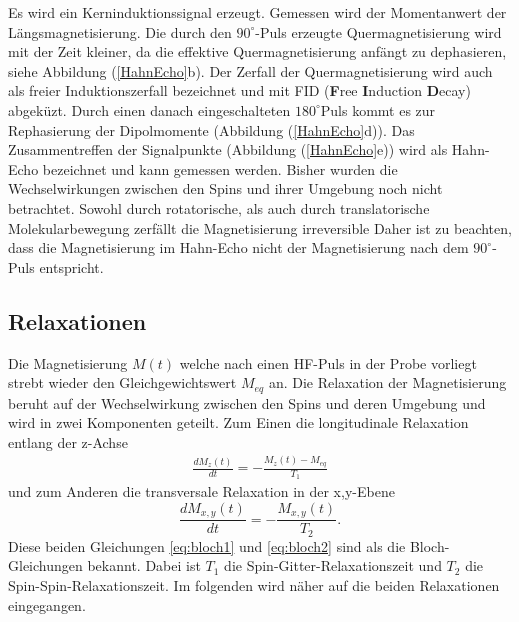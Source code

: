 Es wird ein Kerninduktionssignal erzeugt.
Gemessen wird der Momentanwert der L\"{a}ngsmagnetisierung.
Die durch den $90^{\circ}$-Puls erzeugte Quermagnetisierung wird mit der Zeit kleiner, da die effektive Quermagnetisierung anf\"{a}ngt zu dephasieren, siehe Abbildung (\ref{HahnEcho}b).
Der Zerfall der Quermagnetisierung wird auch als freier Induktionszerfall bezeichnet und mit FID (\textbf{F}ree \textbf{I}nduction \textbf{D}ecay) abgek\"{u}zt.
Durch einen danach eingeschalteten $180^{\circ}${\-}Puls kommt es zur Rephasierung der Dipol{\-}mo{\-}men{\-}te (Abbildung (\ref{HahnEcho}d)).
Das Zusam{\-}men{\-}tref{\-}fen der Signalpunkte (Abbildung (\ref{HahnEcho}e)) wird als Hahn-Echo bezeichnet und kann gemessen werden.
Bisher wurden die Wechselwirkungen zwischen den Spins und ihrer Umgebung noch nicht betrachtet.
Sowohl durch rotatorische, als auch durch translatorische Molekularbewegung zerf\"{a}llt die Magnetisierung irreversible
Daher ist zu beachten, dass die Magnetisierung im Hahn-Echo nicht der Magnetisierung nach dem $90^{\circ}$-Puls entspricht.


\subsection{Relaxationen}
Die Magnetisierung $M(t)$ welche nach einen HF-Puls in der Probe vorliegt strebt wieder den Gleichgewichtswert $M_{eq}$ an.
Die Relaxation der Magnetisierung beruht auf der Wechselwirkung zwischen den Spins und deren Umgebung und wird in zwei Komponenten geteilt.
Zum Einen die longitudinale Relaxation entlang der z-Achse
\begin{align}
	\frac{d M_z(t)}{d t} = - \frac{M_z(t) - M_{eq}}{T_1}
	\label{eq:bloch1}
\end{align}
und zum Anderen die transversale Relaxation in der x,y-Ebene
\begin{equation}
	\frac{d M_{x,y}(t)}{d t} = - \frac{M_{x,y}(t)}{T_2}.
	\label{eq:bloch2}
\end{equation}
Diese beiden Gleichungen \eqref{eq:bloch1} und \eqref{eq:bloch2} sind als die Bloch-Gleichungen bekannt.
Dabei ist $T_1$ die Spin-Gitter-Relaxationszeit und $T_2$ die Spin-Spin-Relaxationszeit.
Im folgenden wird n\"{a}her auf die beiden Relaxationen eingegangen.

